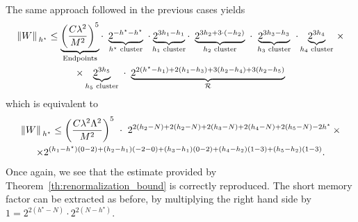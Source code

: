 \documentclass[a4paper, 11pt]{article}
\newcommand{\cutoff}{\Lambda}								%
\newcommand{\ren}{\mathcal{R}}								%
\theoremstyle{thm}
\begin{document}
The same approach followed in the previous cases yields
\begin{multline}
\norm*{W}_{h^\star} \le \underbrace{\left(\frac{C \lambda^2}{M^2}\right)^5}_{\text{Endpoints}} \cdot \,\, \underbrace{2^{-h^\star - h^\star}}_{h^\star \text{ cluster}} \,\, \cdot \underbrace{2^{3h_1 - h_1}}_{h_1 \text{ cluster}} \cdot \,\, \underbrace{2^{3h_2 + 3 \cdot (-h_2)}}_{h_2 \text{ cluster}} \,\, \cdot \,\, \underbrace{2^{3h_3 -h_3}}_{h_3 \text{ cluster}} \,\, \cdot \underbrace{2^{3h_4}}_{h_4 \text{ cluster}} \, \times \\
\times \underbrace{2^{3h_5}}_{h_5 \text{ cluster}} \,\, \cdot \,\, \underbrace{2^{2(h^\star - h_1) + 2(h_1 - h_3) + 3(h_2 - h_4) + 3(h_2 - h_5)}}_{\ren}
\end{multline}
which is equivalent to
\begin{multline}
\norm*{W}_{h^\star} \le \left(\frac{C \lambda^2 \cutoff^2}{M^2}\right)^5 \,\, \cdot \,\, 2^{2(h_2 - N) + 2(h_2 - N) + 2(h_3 - N) + 2(h_4 - N) + 2(h_5 - N) - 2h^\star} \, \times \\
\times 2^{(h_1 - h^\star)(0 - 2) + (h_2 - h_1) (-2 - 0) + (h_3 - h_1)(0 - 2) + (h_4 - h_2)(1 - 3) + (h_5 - h_2)(1 - 3)}.
\end{multline}
Once again, we see that the estimate provided by Theorem~\ref{th:renormalization_bound} is correctly reproduced. The short memory factor can be extracted as before, by multiplying the right hand side by $1 = 2^{2(h^\star - N)} \cdot 2^{2(N - h^\star)}$. 

\newpage

\printbibliography
\end{document}
